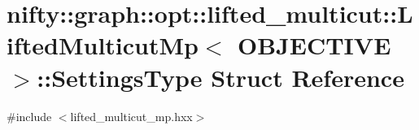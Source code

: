 \hypertarget{structnifty_1_1graph_1_1opt_1_1lifted__multicut_1_1LiftedMulticutMp_1_1SettingsType}{}\section{nifty\+:\+:graph\+:\+:opt\+:\+:lifted\+\_\+multicut\+:\+:Lifted\+Multicut\+Mp$<$ O\+B\+J\+E\+C\+T\+I\+VE $>$\+:\+:Settings\+Type Struct Reference}
\label{structnifty_1_1graph_1_1opt_1_1lifted__multicut_1_1LiftedMulticutMp_1_1SettingsType}


{\ttfamily \#include $<$lifted\+\_\+multicut\+\_\+mp.\+hxx$>$}

